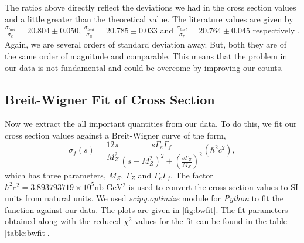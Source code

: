 The ratios above directly reflect the deviations we had in the cross section values and a little greater than the theoretical value. The literature values are given by $\frac{\sigma_{had}}{\sigma_e} = 20.804 \pm 0.050$, $\frac{\sigma_{had}}{\sigma_{\mu}} = 20.785 \pm 0.033$ and $\frac{\sigma_{had}}{\sigma_{\tau}} = 20.764 \pm 0.045$ respectively \cite{pdg2}. Again, we are several orders of standard deviation away. But, both they are of the same order of magnitude and comparable. This means that the problem in our data is not fundamental and could be overcome by improving our counts.

\subsection{Breit-Wigner Fit of Cross Section}
Now we extract the all important quantities from our data. To do this, we fit our cross section values against a Breit-Wigner curve of the form,
\begin{equation}
    \sigma_f (s) = \frac{12\pi}{M_Z^2} \frac{s \Gamma_e \Gamma_f}{(s-M_Z^2)^2 + \left(\frac{s\Gamma_Z}{M_Z}\right)^2} (\hbar^2 c^2),
\end{equation}
which has three parameters, $M_Z$, $\Gamma_Z$ and $\Gamma_e\Gamma_f$. The factor $\hbar^2 c^2 = 3.893793719 \times 10^5 \text{nb GeV$^2$}$ is used to convert the cross section values to SI units from natural units. We used \textit{scipy.optimize} module for \textit{Python} to fit the function against our data. The plots are given in \ref{fig:bwfit}. The fit parameters obtained along with the reduced $\chi^2$ values for the fit can be found in the table \ref{table:bwfit}.\\
